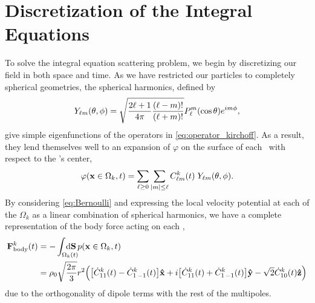 \section{Discretization of the Integral Equations}

To solve the integral equation scattering problem, we begin by discretizing our field in both space and time.
As we have restricted our particles to completely spherical geometries, the spherical harmonics, defined by
\begin{equation} \label{eq:Ylms}
  Y_{\ell m}\quantity(\theta, \phi) = \sqrt{\frac{2\ell + 1}{4\pi}\frac{\quantity(\ell - m)!}{\quantity(\ell + m)!}}P_\ell^m\quantity(\cos\theta)e^{i m \phi},
\end{equation}
give simple eigenfunctions of the operators in \cref{eq:operator_kirchoff}.
As a result, they lend themselves well to an expansion of $\varphi$ on the surface of each \bubble\ with respect to the \bubble's center,
\begin{equation} \label{eq:potential_expansion}
  \varphi(\vb{x}\in\Omega_k, t) = \sum_{\ell \ge 0} \sum_{\abs{m} \le \ell} C^k_{\ell m}(t) \; Y_{\ell m}\qty(\theta, \phi).
\end{equation}
By considering \cref{eq:Bernoulli} and expressing the local velocity potential at each of the $\Omega_k$ as a linear combination of spherical harmonics, we have a complete representation of the body force acting on each \bubble,
\begin{align}
  \vb{F}_\text{body}^k(t) &= - \int_{\Omega_k(t)} \mkern-30mu \dd{\vb{S}} p(\vb{x}\in \Omega_k, t) \nonumber \\
  &= \rho_0 \sqrt{\frac{2\pi}{3}}r^2 \Big(\qty[\dot{C}^k_{11}(t) - \dot{C}^k_{1\, -1}(t)]\vu{x} + i\qty[\dot{C}^k_{11}(t) + \dot{C}^k_{1\,-1}(t)]\vu{y} - \sqrt{2}\dot{C}^k_{10}(t)\vu{z}\Big)
\end{align}
due to the orthogonality of dipole terms with the rest of the multipoles.

